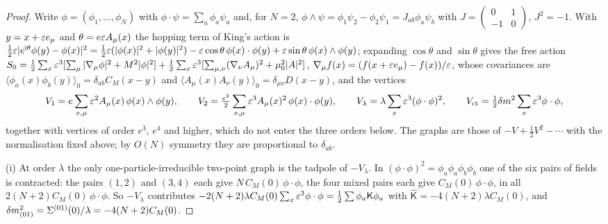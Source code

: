 \begin{proof}
Write $\phi=(\phi_1,\dots,\phi_N)$ with $\phi\cdot\psi=\sum_a\phi_a\psi_a$ and, for $N=2$, $\phi\wedge\psi=\phi_1\psi_2-\phi_2\psi_1=J_{ab}\phi_a\psi_b$ with $J=\begin{pmatrix}0&1\\-1&0\end{pmatrix}$, $J^2=-1$. With $y=x+\varepsilon e_\mu$ and $\theta=e\varepsilon A_\mu(x)$ the hopping term of King's action is $\frac12\varepsilon|e^{\mathrm i\theta}\phi(y)-\phi(x)|^2=\frac12\varepsilon(|\phi(x)|^2+|\phi(y)|^2)-\varepsilon\cos\theta\,\phi(x)\cdot\phi(y)+\varepsilon\sin\theta\,\phi(x)\wedge\phi(y)$; expanding $\cos\theta$ and $\sin\theta$ gives the free action $S_0=\frac12\sum_x\varepsilon^3[\sum_\mu|\nabla_\mu\phi|^2+M^2|\phi|^2]+\frac12\sum_x\varepsilon^3[\sum_{\mu,\nu}(\nabla_\nu A_\mu)^2+\mu_0^2|A|^2]$, $\nabla_\mu f(x)=(f(x+\varepsilon e_\mu)-f(x))/\varepsilon$, whose covariances are $\langle\phi_a(x)\phi_b(y)\rangle_0=\delta_{ab}C_M(x-y)$ and $\langle A_\mu(x)A_\nu(y)\rangle_0=\delta_{\mu\nu}D(x-y)$, and the vertices
\[
V_1=e\sum_{x,\mu}\varepsilon^2A_\mu(x)\,\phi(x)\wedge\phi(y),\qquad V_2=\tfrac{e^2}2\sum_{x,\mu}\varepsilon^3A_\mu(x)^2\,\phi(x)\cdot\phi(y),\qquad V_\lambda=\lambda\sum_x\varepsilon^3(\phi\cdot\phi)^2,\qquad V_{\rm ct}=\tfrac12\delta m^2\sum_x\varepsilon^3\phi\cdot\phi,
\]
together with vertices of order $e^3$, $e^4$ and higher, which do not enter the three orders below. The graphs are those of $-V+\frac12V^2-\cdots$ with the normalisation fixed above; by $O(N)$ symmetry they are proportional to $\delta_{ab}$.

(i) At order $\lambda$ the only one-particle-irreducible two-point graph is the tadpole of $-V_\lambda$. In $(\phi\cdot\phi)^2=\phi_a\phi_a\phi_b\phi_b$ one of the six pairs of fields is contracted: the pairs $(1,2)$ and $(3,4)$ each give $N\,C_M(0)\,\phi\cdot\phi$, the four mixed pairs each give $C_M(0)\,\phi\cdot\phi$, in all $2(N+2)C_M(0)\,\phi\cdot\phi$. So $-V_\lambda$ contributes $-2(N+2)\lambda C_M(0)\sum_x\varepsilon^3\phi\cdot\phi=\frac12\sum\phi_a\mathsf K\phi_a$ with $\hat{\mathsf K}=-4(N+2)\lambda C_M(0)$, and $\delta m^2_{(01)}=\Sigma^{(01)}(0)/\lambda=-4(N+2)C_M(0)$.


\end{proof}
